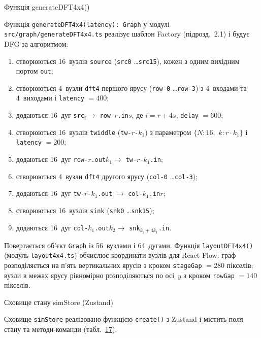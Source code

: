 Функція generateDFT4x4()

Функція \texttt{generateDFT4x4(latency):\ Graph} у модулі
\texttt{src/graph/generateDFT4x4.ts} реалізує шаблон Factory
(підрозд.~2.1) і будує DFG за алгоритмом:

\begin{enumerate}
\def\labelenumi{\arabic{enumi}.}
\item
  створюються 16~вузлів \texttt{source} (\texttt{src0}
  \ldots{}\texttt{src15}), кожен з одним вихідним портом \texttt{out};
\item
  створюються 4~вузли \texttt{dft4} першого ярусу (\texttt{row-0}
  \ldots{}\texttt{row-3}) з 4~входами та 4~виходами і \texttt{latency}
  \(= 400\);
\item
  додаються 16~дуг \texttt{src}\(_{i} \rightarrow\)
  \texttt{row-}\(r\)\texttt{.in}\(s\), де \(i = r + 4s\), \texttt{delay}
  \(= 600\);
\item
  створюються 16~вузлів \texttt{twiddle}
  (\texttt{tw-}\(r\)\texttt{-}\(k_{1}\)) з параметром
  \(\{ N:16,\mspace{6mu} k:r \cdot k_{1}\}\) і \texttt{latency}
  \(= 200\);
\item
  додаються 16~дуг \texttt{row-}\(r\)\texttt{.out}\(k_{1} \rightarrow\)
  \texttt{tw-}\(r\)\texttt{-}\(k_{1}\)\texttt{.in};
\item
  створюються 4~вузли \texttt{dft4} другого ярусу (\texttt{col-0}
  \ldots{}\texttt{col-3});
\item
  додаються 16~дуг \texttt{tw-}\(r\)\texttt{-}\(k_{1}\)\texttt{.out}
  \(\rightarrow\) \texttt{col-}\(k_{1}\)\texttt{.in}\(r\);
\item
  створюються 16~вузлів \texttt{sink} (\texttt{snk0}
  \ldots{}\texttt{snk15});
\item
  додаються 16~дуг
  \texttt{col-}\(k_{1}\)\texttt{.out}\(k_{2} \rightarrow\)
  \texttt{snk}\(_{k_{2} + 4k_{1}}\)\texttt{.in}.
\end{enumerate}

Повертається об'єкт \texttt{Graph} із 56~вузлами і 64~дугами. Функція
\texttt{layoutDFT4x4()} (модуль \texttt{layout4x4.ts}) обчислює
координати вузлів для React Flow: граф розподіляється на п'ять
вертикальних ярусів з кроком \texttt{stageGap} \(= 280\) пікселів; вузли
в межах ярусу рівномірно розподіляються по осі~\(y\) з кроком
\texttt{rowGap} \(= 140\) пікселів.

Сховище стану simStore (Zustand)

Сховище \texttt{simStore} реалізовано функцією \texttt{create()} з
Zustand і містить поля стану та методи-команди
(табл.~\hyperref[tab:store]{17}).

